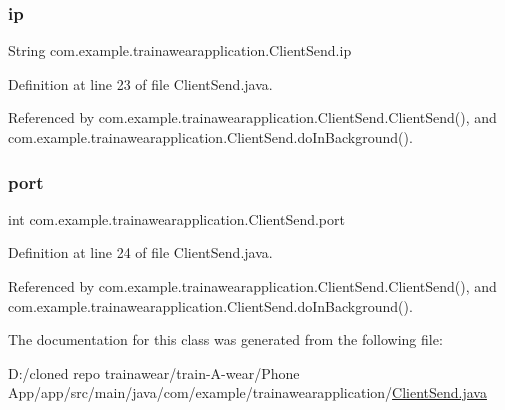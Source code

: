 \subsubsection{\texorpdfstring{ip}{ip}}
{\footnotesize\ttfamily String com.\+example.\+trainawearapplication.\+Client\+Send.\+ip\hspace{0.3cm}{\ttfamily [private]}}



Definition at line 23 of file Client\+Send.\+java.



Referenced by com.\+example.\+trainawearapplication.\+Client\+Send.\+Client\+Send(), and com.\+example.\+trainawearapplication.\+Client\+Send.\+do\+In\+Background().

\mbox{\label{classcom_1_1example_1_1trainawearapplication_1_1_client_send_a1295f5916c4527127a9dd68b7c6fe759}} 
\subsubsection{\texorpdfstring{port}{port}}
{\footnotesize\ttfamily int com.\+example.\+trainawearapplication.\+Client\+Send.\+port\hspace{0.3cm}{\ttfamily [private]}}



Definition at line 24 of file Client\+Send.\+java.



Referenced by com.\+example.\+trainawearapplication.\+Client\+Send.\+Client\+Send(), and com.\+example.\+trainawearapplication.\+Client\+Send.\+do\+In\+Background().



The documentation for this class was generated from the following file\+:\begin{DoxyCompactItemize}
\item 
D\+:/cloned repo trainawear/train-\/\+A-\/wear/\+Phone App/app/src/main/java/com/example/trainawearapplication/\mbox{\hyperlink{_client_send_8java}{Client\+Send.\+java}}\end{DoxyCompactItemize}
